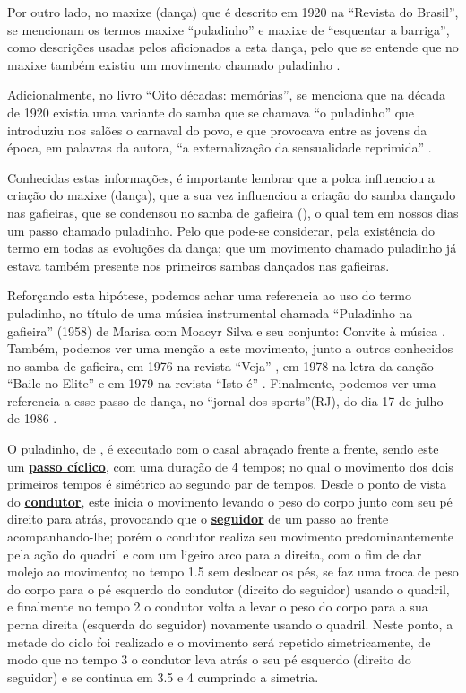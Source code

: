Por outro lado, no maxixe (dança)  que é descrito em 1920 na ``Revista do Brasil'',
se mencionam os termos maxixe ``puladinho'' e maxixe de ``esquentar a barriga'',
como descrições usadas pelos aficionados a esta dança, 
pelo que se entende que no maxixe também existiu um movimento chamado puladinho \cite[pp. 177]{1920revista}. 

Adicionalmente, no livro ``Oito décadas: memórias'', se menciona que na década de
1920 existia uma variante do samba que se chamava ``o puladinho'' 
que introduziu nos salões o carnaval do povo, 
e que provocava entre as jovens da época, em palavras da autora, 
``a externalização da sensualidade reprimida'' \cite[pp. 94-95]{nabuco2000oito}.

Conhecidas estas informações, é importante lembrar que a polca influenciou a criação do maxixe (dança), 
que a sua vez influenciou a criação do samba dançado nas gafieiras,
que se condensou no samba de gafieira (\AnoLivro), o qual tem em nossos dias um passo chamado puladinho. 
Pelo que pode-se considerar, pela existência do termo em todas as evoluções da dança; 
que um movimento chamado puladinho 
já estava também presente nos primeiros sambas dançados nas gafieiras. 

Reforçando esta hipótese, podemos achar uma referencia ao uso do termo puladinho, no título de uma música instrumental chamada 
``Puladinho na gafieira'' (1958)  de  Marisa com Moacyr Silva e seu conjunto: Convite à música \cite{puladinhogafieiramusic}.
Também, podemos ver uma menção a este movimento, junto a outros conhecidos no samba de gafieira,
em 1976 na revista ``Veja'' \cite[pp. 158]{1976veja},
em 1978 na letra da canção ``Baile no Elite'' \cite{BaileNoElite} e 
em 1979 na revista ``Isto é'' \cite[pp. 89]{revista1979isto}.
Finalmente, podemos ver uma referencia a esse passo de dança, no ``jornal dos sports''(RJ),
do dia 17 de julho de 1986 \cite[pp. 6]{gafieiraaredeout2}.


O puladinho, de \AnoLivro, é executado com o casal abraçado frente a frente, sendo este um \hyperref[def:PassoCiclico]{\textbf{passo cíclico}},
com uma duração de 4 tempos; no qual o movimento dos dois primeiros tempos
é simétrico ao segundo par de tempos.
Desde o ponto de vista do  \hyperref[def:Condutor]{\textbf{condutor}}, 
este inicia o movimento levando o peso do corpo junto com seu pé direito para atrás, provocando que
o \hyperref[def:Seguidor]{\textbf{seguidor}} de um passo ao frente acompanhando-lhe;
porém o condutor realiza seu movimento predominantemente pela ação do quadril e com um ligeiro arco para a direita, 
com o fim de dar molejo ao movimento;
no tempo 1.5 sem deslocar os pés, 
se faz uma troca de peso do corpo para o pé esquerdo do condutor (direito do seguidor) usando o quadril,
e finalmente no tempo 2 o condutor volta a levar o peso 
do corpo para a sua perna direita (esquerda do seguidor) novamente usando o quadril.
Neste ponto, a metade do ciclo foi realizado e o movimento será repetido simetricamente, 
de modo que no tempo 3 o condutor leva atrás o seu pé esquerdo (direito do seguidor) e se continua em 3.5 e 4 cumprindo a simetria.

